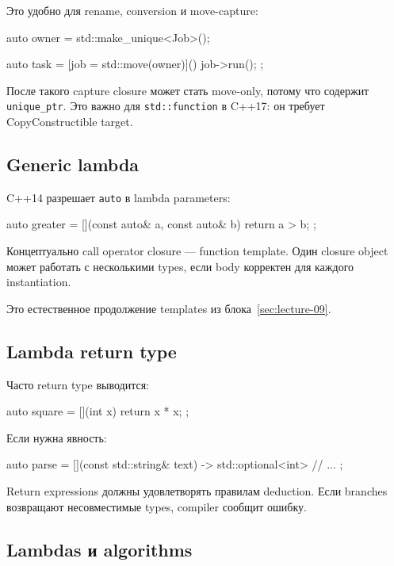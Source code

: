 Это удобно для rename, conversion и move-capture:

\begin{cppcode}
auto owner = std::make_unique<Job>();

auto task =
    [job = std::move(owner)]() {
        job->run();
    };
\end{cppcode}

После такого capture closure может стать move-only, потому что содержит
\texttt{unique\_ptr}. Это важно для \texttt{std::function} в C++17:
он требует CopyConstructible target.

\subsection{Generic lambda}

C++14 разрешает \texttt{auto} в lambda parameters:

\begin{cppcode}
auto greater = [](const auto& a, const auto& b) {
    return a > b;
};
\end{cppcode}

Концептуально call operator closure --- function template. Один closure
object может работать с несколькими types, если body корректен для каждого
instantiation.

Это естественное продолжение templates из блока~\ref{sec:lecture-09}.

\subsection{Lambda return type}

Часто return type выводится:

\begin{cppcode}
auto square = [](int x) {
    return x * x;
};
\end{cppcode}

Если нужна явность:

\begin{cppcode}
auto parse = [](const std::string& text) -> std::optional<int> {
    // ...
};
\end{cppcode}

Return expressions должны удовлетворять правилам deduction. Если branches
возвращают несовместимые types, compiler сообщит ошибку.

\subsection{Lambdas и algorithms}

